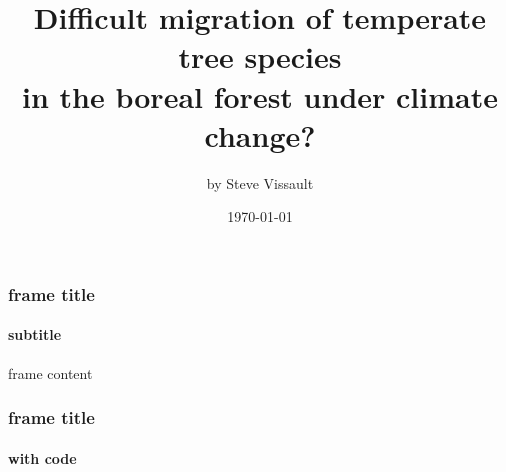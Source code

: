 \documentclass[10pt,aspectratio=149]{beamer}
\author{by Steve Vissault}
\title{ \small Difficult migration of temperate tree species \\
in the boreal forest under climate change?}
\date{\today}
\institute{Université du Québec à Rimouski}
\begin{document}
\begin{frame}[plain]
   \titlepage
\end{frame}

\begin{frame}
   \frametitle{frame title}
   \framesubtitle{subtitle}

   frame content
   
\end{frame}

\begin{frame}[fragile]
   \frametitle{frame title}
   \framesubtitle{with code}


\end{frame}
\end{document}
